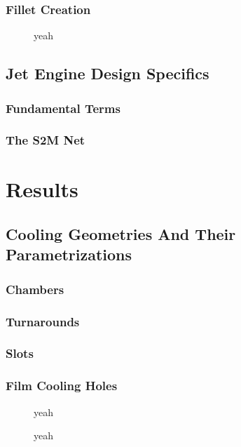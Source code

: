 \documentclass[a4paper, 11pt]{report}
\theoremstyle{definition}
\begin{document}
\subsection{Fillet Creation}
\begin{figure}[H]
	\centering
	
	\caption{yeah}
\end{figure}


\section{Jet Engine Design Specifics}
\subsection{Fundamental Terms}
\subsection{The S2M Net}

\chapter{Results}
\section{Cooling Geometries And Their Parametrizations}
\subsection{Chambers}
\subsection{Turnarounds}
\subsection{Slots}
\subsection{Film Cooling Holes}
\begin{figure}[H]
	\centering
	
	\caption{yeah}
\end{figure}
\begin{figure}[H]
	\centering
	
	\caption{yeah}
\end{figure}
\end{document}
